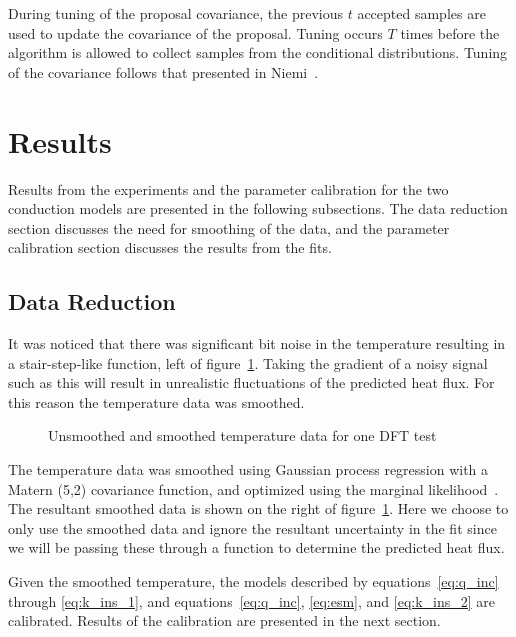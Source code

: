 \documentclass[article]{proc}
\begin{document}
        During tuning of the proposal covariance, the previous $t$ accepted samples are used to update the covariance of the proposal. Tuning occurs $T$ times before the algorithm is allowed to collect samples from the conditional distributions. Tuning of the covariance follows that presented in Niemi~\cite{Niemi:2019}. 

\section{Results}

    Results from the experiments and the parameter calibration for the two conduction models are presented in the following subsections. The data reduction section discusses the need for smoothing of the data, and the parameter calibration section discusses the results from the fits. 

    \subsection{Data Reduction}

        It was noticed that there was significant bit noise in the temperature resulting in a stair-step-like function, left of figure~\ref{fig:tc_data}. Taking the gradient of a noisy signal such as this will result in unrealistic fluctuations of the predicted heat flux. For this reason the temperature data was smoothed.

        \begin{figure}[!]
            \centering
            \qquad
            \caption{Unsmoothed and smoothed temperature data for one DFT test}
            \label{fig:tc_data}
        \end{figure}

        The temperature data was smoothed using Gaussian process regression with a Matern (5,2) covariance function, and optimized using the marginal likelihood~\cite{Rasmussen:2006}. The resultant smoothed data is shown on the right of figure~\ref{fig:tc_data}. Here we choose to only use the smoothed data and ignore the resultant uncertainty in the fit since we will be passing these through a function to determine the predicted heat flux.

        Given the smoothed temperature, the models described by equations~\ref{eq:q_inc} through \ref{eq:k_ins_1}, and equations~\ref{eq:q_inc}, \ref{eq:esm}, and \ref{eq:k_ins_2} are calibrated. Results of the calibration are presented in the next section.
\end{document}
